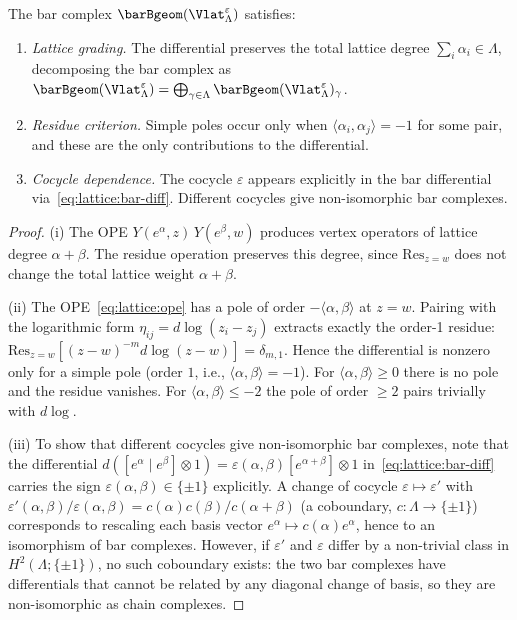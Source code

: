 \begin{theorem}
\label{thm:lattice:bar-structure}
The bar complex $\barBgeom(\Vlat_\Lambda^\varepsilon)$ satisfies:
\begin{enumerate}[label=(\roman*)]
\item \emph{Lattice grading.}
 The differential preserves the total lattice degree
 $\sum_i \alpha_i \in \Lambda$, decomposing the bar complex as
 $\barBgeom(\Vlat_\Lambda^\varepsilon) =
 \bigoplus_{\gamma \in \Lambda}
 \barBgeom(\Vlat_\Lambda^\varepsilon)_\gamma$.
\item \emph{Residue criterion.}
 Simple poles occur only when $\langle\alpha_i,\alpha_j\rangle = -1$
 for some pair, and these are the only contributions to the differential.
\item \emph{Cocycle dependence.}
 The cocycle $\varepsilon$ appears explicitly in the bar differential
 via~\eqref{eq:lattice:bar-diff}. Different cocycles give
 non-isomorphic bar complexes.
\end{enumerate}
\end{theorem}

\begin{proof}
(i) The OPE $Y(e^\alpha, z)\,Y(e^\beta, w)$ produces vertex operators
of lattice degree $\alpha + \beta$. The residue operation preserves
this degree, since $\mathrm{Res}_{z=w}$ does not change the total lattice
weight $\alpha + \beta$.

(ii) The OPE~\eqref{eq:lattice:ope} has a pole of order
$-\langle\alpha,\beta\rangle$ at $z = w$. Pairing with the logarithmic
form $\eta_{ij} = d\log(z_i - z_j)$ extracts exactly the order-1 residue:
$\mathrm{Res}_{z=w}[(z-w)^{-m} d\log(z-w)] = \delta_{m,1}$.
Hence the differential is nonzero only for a simple pole (order $1$,
i.e., $\langle\alpha,\beta\rangle = -1$). For $\langle\alpha,\beta\rangle \geq 0$
there is no pole and the residue vanishes. For $\langle\alpha,\beta\rangle \leq -2$
the pole of order $\geq 2$ pairs trivially with $d\log$.

(iii) To show that different cocycles give non-isomorphic bar complexes,
note that the differential $d([e^\alpha \mid e^\beta] \otimes 1) = \varepsilon(\alpha,\beta)[e^{\alpha+\beta}]\otimes 1$
in~\eqref{eq:lattice:bar-diff} carries the sign $\varepsilon(\alpha,\beta) \in \{\pm 1\}$
explicitly. A change of cocycle $\varepsilon \mapsto \varepsilon'$ with
$\varepsilon'(\alpha,\beta)/\varepsilon(\alpha,\beta) = c(\alpha)c(\beta)/c(\alpha+\beta)$
(a coboundary, $c: \Lambda \to \{\pm 1\}$) corresponds to rescaling each basis vector
$e^\alpha \mapsto c(\alpha)e^\alpha$, hence to an isomorphism of bar complexes.
However, if $\varepsilon'$ and $\varepsilon$ differ by a non-trivial class in
$H^2(\Lambda;\{\pm 1\})$, no such coboundary exists: the two bar complexes have
differentials that cannot be related by any diagonal change of basis, so they are
non-isomorphic as chain complexes.
\end{proof}

